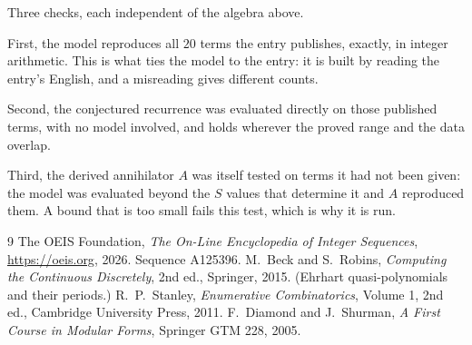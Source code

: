 \documentclass[11pt,a4paper]{article}
\theoremstyle{plain}
\theoremstyle{definition}
\begin{document}
Three checks, each independent of the algebra above.

First, the model reproduces all $20$ terms the entry publishes, exactly, in integer
arithmetic. This is what ties the model to the entry: it is built by reading the entry's
English, and a misreading gives different counts.

Second, the conjectured recurrence was evaluated directly on those published terms, with no
model involved, and holds wherever the proved range and the data overlap.

Third, the derived annihilator $A$ was itself tested on terms it had not been given: the model
was evaluated beyond the $S$ values that determine it and $A$ reproduced them. A bound that is
too small fails this test, which is why it is run.

\begin{thebibliography}{9}
 The OEIS Foundation, \emph{The On-Line Encyclopedia of Integer
Sequences}, \url{https://oeis.org}, 2026. Sequence A125396.
 M.~Beck and S.~Robins, \emph{Computing the Continuous Discretely},
2nd ed., Springer, 2015. (Ehrhart quasi-polynomials and their periods.)
 R.~P.~Stanley, \emph{Enumerative Combinatorics}, Volume 1, 2nd ed.,
Cambridge University Press, 2011.
 F.~Diamond and J.~Shurman, \emph{A First Course in Modular Forms},
Springer GTM 228, 2005.
\end{thebibliography}
\end{document}
